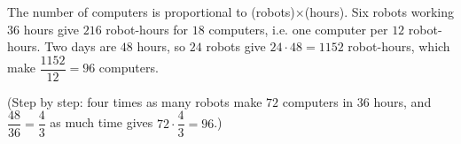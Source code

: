 The number of computers is proportional to (robots)$\times$(hours). Six robots working $36$ hours give $216$ robot-hours for $18$ computers, i.e. one computer per $12$ robot-hours. Two days are $48$ hours, so $24$ robots give $24\cdot48=1152$ robot-hours, which make $\dfrac{1152}{12}=\boxed{96}$ computers.

(Step by step: four times as many robots make $72$ computers in $36$ hours, and $\dfrac{48}{36}=\dfrac43$ as much time gives $72\cdot\dfrac43=96$.)
